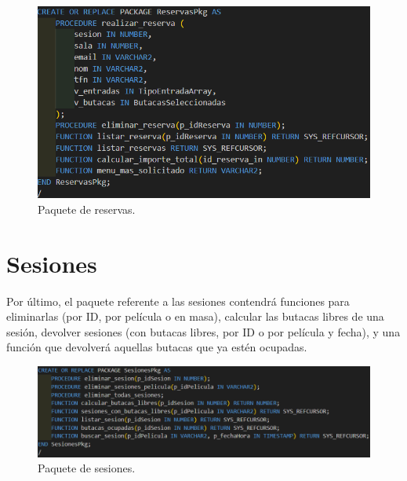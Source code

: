 \begin{figure}[ht]
    \centering
    \includegraphics[width=0.7\linewidth]{documentation//apartados//paquetes/paquete-reservas.png}
    \caption{Paquete de reservas.}
\end{figure}

\newpage

\section{Sesiones}
Por último, el paquete referente a las sesiones contendrá funciones para eliminarlas (por ID, por película o en masa), calcular las butacas libres de una sesión, devolver sesiones (con butacas libres, por ID o por película y fecha), y una función que devolverá aquellas butacas que ya estén ocupadas.

\begin{figure}[ht]
    \centering
    \includegraphics[width=0.7\linewidth]{documentation//apartados//paquetes/paquete-sesiones.png}
    \caption{Paquete de sesiones.}
\end{figure}
